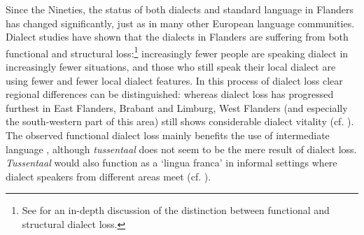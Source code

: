 \documentclass[output=paper]{LSP/langsci}
\begin{document}
\largerpage
Since the Nineties, the status of both dialects and standard language in Flanders has changed significantly, just as in many other European language communities. Dialect studies have shown that the dialects in Flanders are suffering from both functional \citep{ghyselen_dialectcompetentie_2014} and structural \citep{heeringa_convergence_2014,vandekerckhove_structurele_2000} loss:\footnote{See \citet{ghyselen_dialectcompetentie_2014} for an in-depth discussion of the distinction between functional and structural dialect loss.} increasingly fewer people are speaking dialect in increasingly fewer situations, and those who still speak their local dialect are using fewer and fewer local dialect features. In this process of dialect loss clear regional differences can be distinguished: whereas dialect loss has progressed furthest in East Flanders, Brabant and Limburg, West Flanders (and especially the south-western part of this area) still shows considerable dialect vitality (cf. \citealt{ghyselen_dialectcompetentie_2014}). The observed functional dialect loss mainly benefits the use of intermediate language \citep{de_caluwe_tussentaal_2006}, although \textit{tussentaal} does not seem to be the mere result of dialect loss. \textit{Tussentaal} would also function as a ‘lingua franca’ in informal settings where dialect speakers from different areas meet (cf. \citealt{gabel_taalaccommodatie_2010}). 
\end{document}
